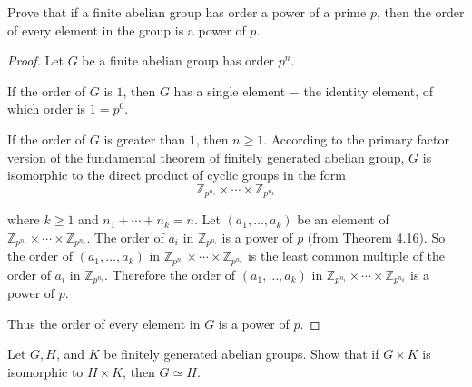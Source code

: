 \newpage
\begin{exercise}
    Prove that if a finite abelian group has order a power of a prime $p$, then the order of every element in the group is a power of $p$.
\end{exercise}

\begin{proof}
    Let $G$ be a finite abelian group has order $p^{n}$.

    If the order of $G$ is $1$, then $G$ has a single element $-$ the identity element, of which order is $1 = p^{0}$.

    If the order of $G$ is greater than $1$, then $n\geq 1$. According to the primary factor version of the fundamental theorem of finitely generated abelian group, $G$ is isomorphic to the direct product of cyclic groups in the form
    \[
        \mathbb{Z}_{p^{n_{1}}} \times \cdots \times \mathbb{Z}_{p^{n_{k}}}
    \]

    where $k\geq 1$ and $n_{1} + \cdots + n_{k} = n$. Let $(a_{1}, \ldots, a_{k})$ be an element of $\mathbb{Z}_{p^{n_{1}}} \times \cdots \times \mathbb{Z}_{p^{n_{k}}}$. The order of $a_{i}$ in $\mathbb{Z}_{p^{n_{i}}}$ is a power of $p$ (from Theorem 4.16). So the order of $(a_{1}, \ldots, a_{k})$ in $\mathbb{Z}_{p^{n_{1}}} \times \cdots \times \mathbb{Z}_{p^{n_{k}}}$ is the least common multiple of the order of $a_{i}$ in $\mathbb{Z}_{p^{n_{i}}}$. Therefore the order of $(a_{1}, \ldots, a_{k})$ in $\mathbb{Z}_{p^{n_{1}}} \times \cdots \times \mathbb{Z}_{p^{n_{k}}}$ is a power of $p$.

    Thus the order of every element in $G$ is a power of $p$.
\end{proof}

\newpage
\begin{exercise}
    Let $G, H$, and $K$ be finitely generated abelian groups. Show that if $G\times K$ is isomorphic to $H\times K$, then $G\simeq H$.
\end{exercise}

